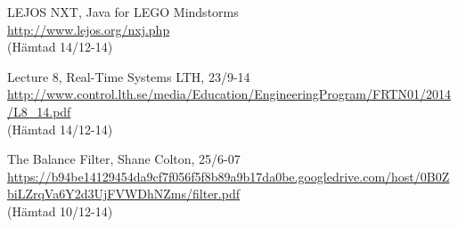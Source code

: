 \documentclass[a4paper]{article}
\begin{document}
\begin{thebibliography}{1}
LEJOS NXT, Java for LEGO Mindstorms\\
\url{http://www.lejos.org/nxj.php}\\
(Hämtad 14/12-14)

Lecture 8, Real-Time Systems LTH, 23/9-14\\
\url{http://www.control.lth.se/media/Education/EngineeringProgram/FRTN01/2014/L8_14.pdf}\\
(Hämtad 14/12-14)

The Balance Filter, Shane Colton, 25/6-07\\
\url{https://b94be14129454da9cf7f056f5f8b89a9b17da0be.googledrive.com/host/0B0ZbiLZrqVa6Y2d3UjFVWDhNZms/filter.pdf}\\
(Hämtad 10/12-14)
\end{thebibliography}
\end{document}

